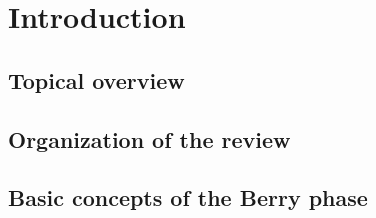 \section{Introduction}
\subsection{Topical overview}

\subsection{Organization of the review}

\subsection{Basic concepts of the Berry phase}